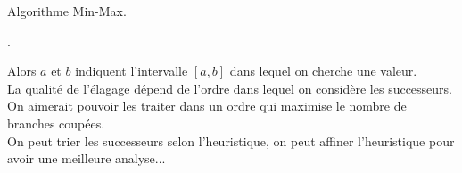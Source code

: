 \documentclass[french, 11pt]{article}
\begin{document}
\begin{defi}{Algorithme Min-Max.}{}
\begin{algorithm}[H]
{            
            .
        }
    \end{algorithm}
    Alors $a$ et $b$ indiquent l'intervalle $[a,b]$ dans lequel on cherche une valeur.\\
    La qualité de l'élagage dépend de l'ordre dans lequel on considère les successeurs.\\
    On aimerait pouvoir les traiter dans un ordre qui maximise le nombre de branches coupées.\\
    On peut trier les successeurs selon l'heuristique, on peut affiner l'heuristique pour avoir une meilleure analyse...
\end{defi}
\end{document}
